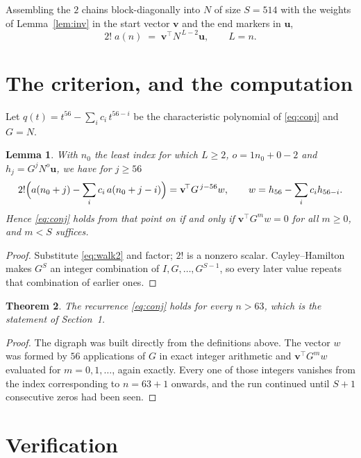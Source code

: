 \documentclass[11pt,a4paper]{article}
\theoremstyle{plain}
\newtheorem{theorem}{Theorem}
\newtheorem{lemma}[theorem]{Lemma}
\theoremstyle{definition}
\begin{document}
Assembling the $2$ chains block-diagonally into $N$ of size $S=514$ with the weights of
Lemma~\ref{lem:inv} in the start vector $\mathbf{v}$ and the end markers in
$\mathbf{u}$,
\begin{equation}\label{eq:walk2}
2!\;a(n)\;=\;\mathbf{v}^{\!\top}N^{\,L-2}\mathbf{u},\qquad L=n .
\end{equation}

\section{The criterion, and the computation}

Let $q(t)=t^{56}-\sum_i c_i\,t^{56-i}$ be the characteristic polynomial of
\eqref{eq:conj} and $G=N$.

\begin{lemma}\label{lem:crit}
With $n_0$ the least index for which $L\ge2$, $o=1n_0+0-2$ and
$h_j=G^{j}N^{o}\mathbf{u}$, we have for $j\ge56$
\[
2!\Bigl(a(n_0+j)-\sum_i c_i\,a(n_0+j-i)\Bigr)=\mathbf{v}^{\!\top}G^{\,j-56}w,
\qquad w=h_{56}-\sum_i c_i h_{56-i} .
\]
Hence \eqref{eq:conj} holds from that point on if and only if
$\mathbf{v}^{\!\top}G^{m}w=0$ for all $m\ge0$, and $m<S$ suffices.
\end{lemma}

\begin{proof}
Substitute \eqref{eq:walk2} and factor; $2!$ is a nonzero scalar. Cayley--Hamilton
makes $G^{S}$ an integer combination of $I,G,\dots,G^{S-1}$, so every later value repeats
that combination of earlier ones.
\end{proof}

\begin{theorem}
The recurrence \eqref{eq:conj} holds for every $n>63$, which is the statement of
Section~1.
\end{theorem}

\begin{proof}
The digraph was built directly from the definitions above. The vector $w$ was formed by
$56$ applications of $G$ in exact integer arithmetic and $\mathbf{v}^{\!\top}G^{m}w$
evaluated for $m=0,1,\dots$, again exactly. Every one of those integers vanishes from the
index corresponding to $n=63+1$ onwards, and the run continued until $S+1$ consecutive
zeros had been seen.
\end{proof}

\section{Verification}
\end{document}
